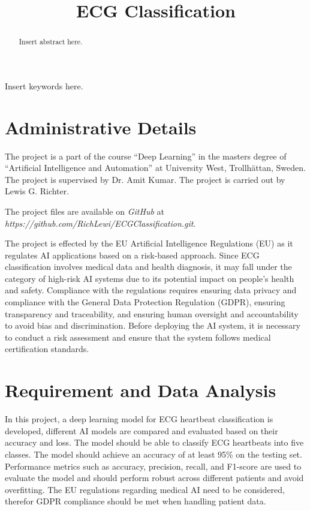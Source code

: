 \documentclass[conference]{IEEEtran}
\begin{document}
\title{ECG Classification}
\author{}

\maketitle

\begin{abstract}
Insert abstract here.
\end{abstract}

\begin{IEEEkeywords}
Insert keywords here.
\end{IEEEkeywords}

\section{Administrative Details}
The project is a part of the course ``Deep Learning'' in the masters degree of ``Artificial Intelligence and Automation'' at University West, Trollhättan, Sweden. The project is supervised by Dr. Amit Kumar. The project is carried out by Lewis G. Richter.

The project files are available on \textit{GitHub} at \textit{https://github.com/RichLewi/ECGClassification.git}.

The project is effected by the EU Artificial Intelligence Regulations (EU) as it regulates AI applications based on a risk-based approach. Since ECG classification involves medical data and health diagnosis, it may fall under the category of high-risk AI systems due to its potential impact on people's health and safety. Compliance with the regulations requires ensuring data privacy and compliance with the General Data Protection Regulation (GDPR), ensuring transparency and traceability, and ensuring human oversight and accountability to avoid bias and discrimination. Before deploying the AI system, it is necessary to conduct a risk assessment and ensure that the system follows medical certification standards. 

\section{Requirement and Data Analysis}
In this project, a deep learning model for ECG heartbeat classification is developed, different AI models are compared and evaluated based on their accuracy and loss. The model should be able to classify ECG heartbeats into five classes. The model should achieve an accuracy of at least 95\% on the testing set. Performance metrics such as accuracy, precision, recall, and F1-score are used to evaluate the model and should perform robust across different patients and avoid overfitting.
The EU regulations regarding medical AI need to be considered, therefor GDPR compliance should be met when handling patient data. 
\end{document}
